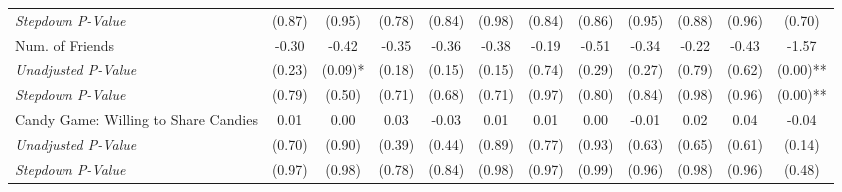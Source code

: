 \begin{tabular}{l c c c c c c c c c c c}
\quad \textit{Stepdown P-Value} & (0.87) & (0.95) & (0.78) & (0.84) & (0.98) & (0.84) & (0.86) & (0.95) & (0.88) & (0.96) & (0.70) \\
Num. of Friends & -0.30 & -0.42 & -0.35 & -0.36 & -0.38 & -0.19 & -0.51 & -0.34 & -0.22 & -0.43 & -1.57 \\
\quad \textit{Unadjusted P-Value} & (0.23) & (0.09)* & (0.18) & (0.15) & (0.15) & (0.74) & (0.29) & (0.27) & (0.79) & (0.62) & (0.00)** \\
\quad \textit{Stepdown P-Value} & (0.79) & (0.50) & (0.71) & (0.68) & (0.71) & (0.97) & (0.80) & (0.84) & (0.98) & (0.96) & (0.00)** \\
Candy Game: Willing to Share Candies & 0.01 & 0.00 & 0.03 & -0.03 & 0.01 & 0.01 & 0.00 & -0.01 & 0.02 & 0.04 & -0.04 \\
\quad \textit{Unadjusted P-Value} & (0.70) & (0.90) & (0.39) & (0.44) & (0.89) & (0.77) & (0.93) & (0.63) & (0.65) & (0.61) & (0.14) \\
\quad \textit{Stepdown P-Value} & (0.97) & (0.98) & (0.78) & (0.84) & (0.98) & (0.97) & (0.99) & (0.96) & (0.98) & (0.96) & (0.48) \\
\bottomrule
\end{tabular}
